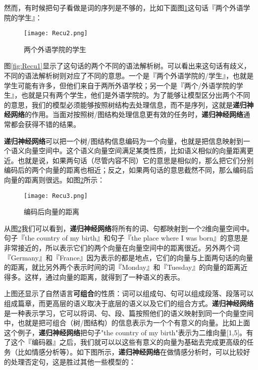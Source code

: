 然而，有时候把句子看做是词的序列是不够的，比如下面图\ref{fig:Recu2}这句话『两个外语学院的学生』：

\begin{figure}[!h]
	\centering
	\texttt{[image: Recu2.png]}
	\caption{两个外语学院的学生}
	\label{fig:Recu2}
\end{figure}

图\ref{fig:Recu1}显示了这句话的两个不同的语法解析树。可以看出来这句话有歧义，不同的语法解析树则对应了不同的意思。一个是『两个外语学院的/学生』，也就是学生可能有许多，但他们来自于两所外语学校；另一个是『两个/外语学院的学生』，也就是只有两个学生，他们是外语学院的。为了能够让模型区分出两个不同的意思，我们的模型必须能够按照树结构去处理信息，而不是序列，这就是\textbf{递归神经网络}的作用。当面对按照树/图结构处理信息更有效的任务时，\textbf{递归神经网络}通常都会获得不错的结果。

\textbf{递归神经网络}可以把一个树/图结构信息编码为一个向量，也就是把信息映射到一个语义向量空间中。这个语义向量空间满足某类性质，比如语义相似的向量距离更近。也就是说，如果两句话（尽管内容不同）它的意思是相似的，那么把它们分别编码后的两个向量的距离也相近；反之，如果两句话的意思截然不同，那么编码后向量的距离则很远。如图\ref{fig:Recu3}所示：

\begin{figure}[!h]
	\centering
	\texttt{[image: Recu3.png]}
	\caption{编码后向量的距离}
	\label{fig:Recu3}
\end{figure}

从图\ref{fig:Recu3}我们可以看到，\textbf{递归神经网络}将所有的词、句都映射到一个2维向量空间中。句子『the country of my birth』和句子『the place where I was born』的意思是非常接近的，所以表示它们的两个向量在向量空间中的距离很近。另外两个词『Germany』和『France』因为表示的都是地点，它们的向量与上面两句话的向量的距离，就比另外两个表示时间的词『Monday』和『Tuesday』的向量的距离近得多。这样，通过向量的距离，就得到了一种语义的表示。

上图还显示了自然语言\textbf{可组合}的性质：词可以组成句、句可以组成段落、段落可以组成篇章，而更高层的语义取决于底层的语义以及它们的组合方式。\textbf{递归神经网络}是一种表示学习，它可以将词、句、段、篇按照他们的语义映射到同一个向量空间中，也就是把可组合（树/图结构）的信息表示为一个个有意义的向量。比如上面这个例子，\textbf{递归神经网络}把句子"the
country of my birth"表示为二维向量{[}1,5{]}。有了这个『编码器』之后，我们就可以以这些有意义的向量为基础去完成更高级的任务（比如情感分析等）。如下图所示，\textbf{递归神经网络}在做情感分析时，可以比较好的处理否定句，这是胜过其他一些模型的：

